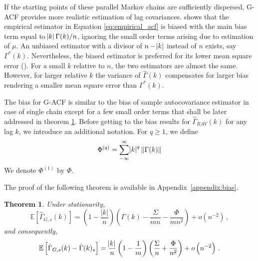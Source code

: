 \documentclass[11pt]{article}
\newtheorem{theorem}{Theorem}
\theoremstyle{remark}
\begin{document}
If the starting points of these parallel Markov chains are sufficiently dispersed, G-ACF provides more realistic estimation of lag covariances. \cite{priestley1981spectral} shows that the empirical estimator in Equation \ref{eq:empirical_acf} is biased with the main bias term equal to $\abs{k}\Gamma(k)/n$, ignoring the small order terms arising due to estimation of $\mu$. An unbiased estimator with a divisor of $n - \abs{k}$ instead of $n$ exists, say $\Gamma^*(k)$. Nevertheless, the biased estimator is preferred for its lower mean square error (\cite{priestley1981spectral}). For a small $k$ relative to $n$, the two estimators are almost the same. However, for larger relative $k$ the variance of $\hat{\Gamma}(k)$ compensates for larger bias rendering a smaller mean square error than $\Gamma^*(k)$. 




The bias for G-ACF is similar to the bias of sample autocovariance estimator in case of single chain except for a few small order terms that shall be later addressed in theorem \ref{th:G-_expec}. Before getting to the bias results for $\hat{\Gamma}_{RAV}(k)$ for any lag $k$, we introduce an additional notation. For $q \geq 1$, we define
\[
\Phi^{(q)} = \sum\limits_{-\infty}^{\infty}\abs{k}^q \|\Gamma(k)\|
\]
We denote $\Phi^{(1)} \textrm{ by } \Phi$. 

The proof of the following theorem is available in Appendix~\ref{appendix:bias}.
\begin{theorem} \label{th:G-_expec} Under stationarity,
\[
   \mathbb{E} \left[\hat{\Gamma}_{G,s}(k) \right] = \left(1- \dfrac{|k|}{n}\right) \left(\Gamma(k) - \dfrac{\Sigma}{mn} - \dfrac{\Phi}{mn^2}\right)  + o \left(n^{-2} \right)\,,
\]
and consequently,
\[
\mathbb{E} \left[\hat{\Gamma}_{G,s}(k) - \hat{\Gamma}(k)_s \right] = \dfrac{\abs{k}}{n}\left(1 - \dfrac{1}{m}\right)\left(\dfrac{\Sigma}{n} + \dfrac{\Phi}{n^2}\right) + o\left(n^{-2} \right)\,. 
\]
\end{theorem}
\end{document}
